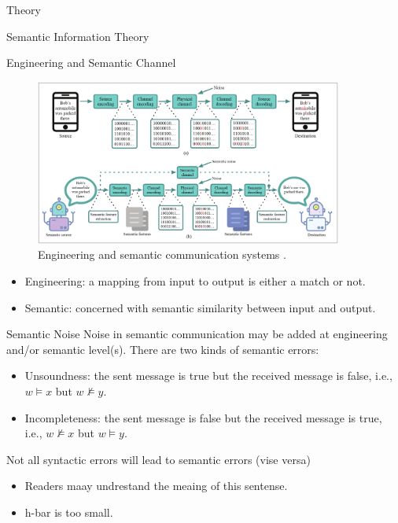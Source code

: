 \documentclass[presentation,mathserif,9pt]{beamer}
\begin{document}
\begin{section}{Theory}
\begin{subsection}{Semantic Information Theory}
		\begin{frame}{Engineering and Semantic Channel}
			\begin{figure}
				\includegraphics[width=0.9\textwidth]{assets/engineering_and_semantic_communications.jpg}
				\caption{Engineering and semantic communication systems \cite{Luo2022a}.}
			\end{figure}
			\begin{itemize}
				\item Engineering: a mapping from input to output is either a match or not.
				\item Semantic: concerned with semantic similarity between input and output.
			\end{itemize}
		\end{frame}

		\begin{frame}{Semantic Noise}
			Noise in semantic communication may be added at engineering and/or semantic level(s).
			There are two kinds of semantic errors:
			\begin{itemize}
				\item Unsoundness: the sent message is true but the received message is false, i.e., $w \models x$ but $w \not\models y$.
				\item Incompleteness: the sent message is false but the received message is true, i.e., $w \not\models x$ but $w \models y$.
			\end{itemize}

			\begin{exampleblock}{Not all syntactic errors will lead to semantic errors (vise versa)}
				\begin{itemize}
					\item Readers maay undrestand the meaing of this sentense.
					\item h-bar is too small.
				\end{itemize}
			\end{exampleblock}
		\end{frame}


\end{subsection}
\end{section}
\end{document}
